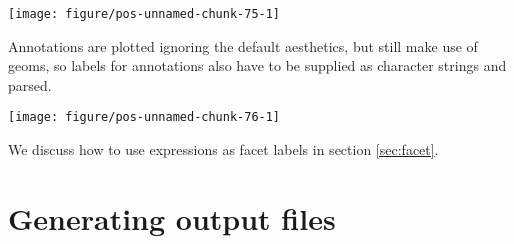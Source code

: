 \documentclass[paper=a4,10pt,div=17,headsepline,BCOR=12mm,twoside,open=right]{scrbook}\usepackage{knitr}
\begin{document}
\begin{knitrout}\footnotesize
{}\color{fgcolor}\begin{kframe}
\begin{alltt}
 \hlkwb{<-} \hlstd{(}\hlstd{(alpha[}\hlstd{]} \hlopt{+} 
 \hlopt{+} \hlstd{(}
\end{alltt}
\end{kframe}

{\centering \texttt{[image: figure/pos-unnamed-chunk-75-1]} 

}



\end{knitrout}

Annotations are plotted ignoring the default aesthetics, but still make use of geoms, so labels for annotations also have to be supplied as character strings and parsed.

\begin{knitrout}\footnotesize
{}\color{fgcolor}\begin{kframe}
\begin{alltt}
 \hlopt{+} \hlstd{(}\hlstd{,}\hlstd{)} \hlopt{+}
  \hlstd{(}\hlstd{,} \hlstd{=}\hlstd{,}
           \hlstd{=}\hlstd{,} \hlstd{=}\hlstd{,} \hlstd{=}\hlstd{,} \hlstd{=}\hlstd{,} \hlstd{=}\hlstd{)}
\end{alltt}
\end{kframe}

{\centering \texttt{[image: figure/pos-unnamed-chunk-76-1]} 

}



\end{knitrout}

We discuss how to use expressions as facet labels in section \ref{sec:facet}.

\section{Generating output files}
\end{document}
